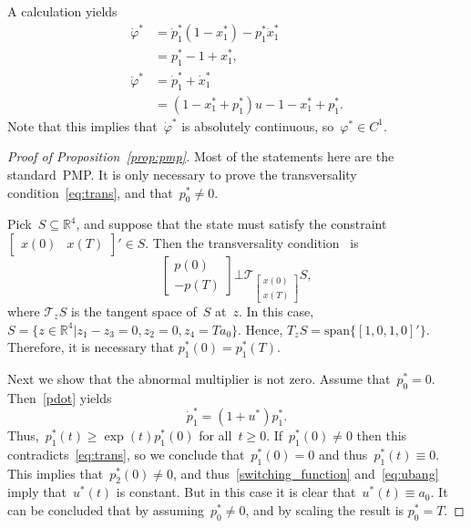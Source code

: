 A calculation yields
%
\begin{subequations}
	\begin{align} \label{phidot}
		\dot \varphi^*  &= \dot p_1 ^*(1-x_1^*) - p_1^* \dot x_1^*\\
		&= p_1^*   - 1+ x_1^* ,  \\
		\ddot\varphi^*  & =  \dot p_1^*+\dot x_1^* \\
		&=  ( 1-x_1^* +   p_1^*) u-   1-x_1^*+ p_1^*  . 
	\end{align}
\end{subequations}
%
Note that this implies that~$\dot\varphi^* $ is absolutely continuous, so~$\varphi^*  \in C^1$. 

\begin{proof}[Proof of Proposition~\ref{prop:pmp}]
	Most of the statements here are the standard~\ac{PMP}. 
	It is only necessary to prove  the transversality condition~\eqref{eq:trans}, and that~$p_0^*\not =0$. 
	
	Pick~$S\subseteq  \mathbb{R}^4$, and suppose that the state must satisfy the  constraint~$ \begin{bmatrix} x(0) & x(T) \end{bmatrix}' \in S$. 
	Then the transversality condition~\cite{LeeMarkus} is
	\begin{equation}
	\begin{bmatrix} p(0) \\ -p(T) \end{bmatrix} \bot \mathcal T_{  \begin{bmatrix} x(0) \\ x(T) \end{bmatrix} } S, 
	\end{equation}
	where $\mathcal T_{z } S$ is the  tangent space 
	of~$S$ at~$z $.
	In this case, $S = \{ z \in \mathbb{R}^4 | z_1-z_3=0, z_2=0, z_4=T a_0\}$. 
	Hence, $T_z S=\mbox{span}\{[1,0,1,0]'\}$.
	Therefore, it is necessary that $p_1^*(0)=p_1^*(T)$.
	
	Next  we show that the abnormal multiplier is not zero.
	Assume that~$p_0^*=0$. Then~\eqref{pdot} yields~ 
	\begin{equation}
	\dot  p_1^* = (1+u^* ) p_1^*.
	\end{equation}
	Thus,~$p_1^*(t)\geq \exp(t) p_1^*(0)$ for all~$t\geq 0$. 
	If~$p_1^*(0)\not =0$ then this contradicts~\eqref{eq:trans}, so we conclude that~$p_1^*(0)=0$ and thus~$p_1^*(t) \equiv 0$. 
	This implies that~$p_2^*(0)\not =0$, and thus~\eqref{switching_function} and~\eqref{eq:ubang} imply that~$u^*(t)$ is constant. 
	But in this case it is clear that~$u^*(t)\equiv a_0$. 
	It can be concluded that by assuming~$p_0^*\not=0$, and by scaling the result is $p_0^*=T$.
\end{proof}


